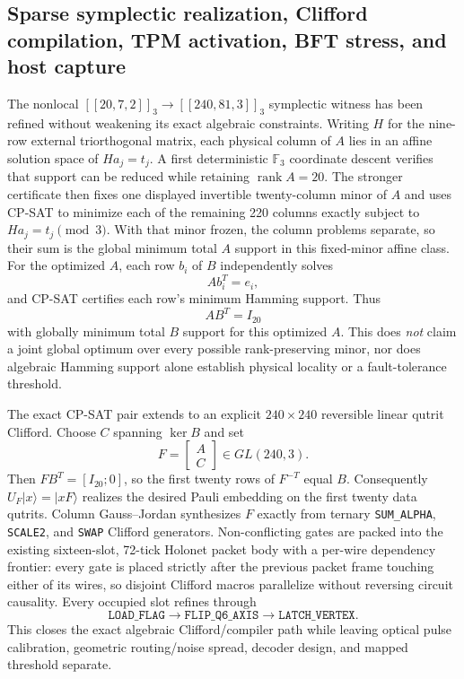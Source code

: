 \subsection{Sparse symplectic realization, Clifford compilation, TPM activation, BFT stress, and host capture}

The nonlocal $[[20,7,2]]_3\to[[240,81,3]]_3$ symplectic witness has been
refined without weakening its exact algebraic constraints.  Writing $H$ for the
nine-row external triorthogonal matrix, each physical column of $A$ lies in an
affine solution space of $H a_j=t_j$.  A first deterministic $\mathbb F_3$
coordinate descent verifies that support can be reduced while retaining
$\operatorname{rank}A=20$.  The stronger certificate then fixes one displayed
invertible twenty-column minor of $A$ and uses CP-SAT to minimize each of the
remaining 220 columns exactly subject to $H a_j=t_j\pmod3$.  With that minor
frozen, the column problems separate, so their sum is the global minimum total
$A$ support in this fixed-minor affine class.  For the optimized $A$, each row
$b_i$ of $B$ independently solves
\[
A b_i^T=e_i,
\]
and CP-SAT certifies each row's minimum Hamming support.  Thus
\[
A B^T=I_{20}
\]
with globally minimum total $B$ support for this optimized $A$.  This does
\emph{not} claim a joint global optimum over every possible rank-preserving
minor, nor does algebraic Hamming support alone establish physical locality or a
fault-tolerance threshold.

The exact CP-SAT pair extends to an explicit $240\times240$ reversible linear
qutrit Clifford.  Choose $C$ spanning $\ker B$ and set
\[
F=\begin{bmatrix}A\\C\end{bmatrix}\in GL(240,3).
\]
Then $F B^T=[I_{20};0]$, so the first twenty rows of $F^{-T}$ equal $B$.
Consequently $U_F|x\rangle=|xF\rangle$ realizes the desired Pauli embedding on
the first twenty data qutrits.  Column Gauss--Jordan synthesizes $F$ exactly
from ternary \texttt{SUM\_ALPHA}, \texttt{SCALE2}, and \texttt{SWAP} Clifford
generators.  Non-conflicting gates are packed into the existing sixteen-slot,
72-tick Holonet packet body with a per-wire dependency frontier: every gate is
placed strictly after the previous packet frame touching either of its wires,
so disjoint Clifford macros parallelize without reversing circuit causality.
Every occupied slot refines through
\[
\texttt{LOAD\_FLAG}\to\texttt{FLIP\_Q6\_AXIS}\to\texttt{LATCH\_VERTEX}.
\]
This closes the exact algebraic Clifford/compiler path while leaving optical
pulse calibration, geometric routing/noise spread, decoder design, and mapped
threshold separate.


